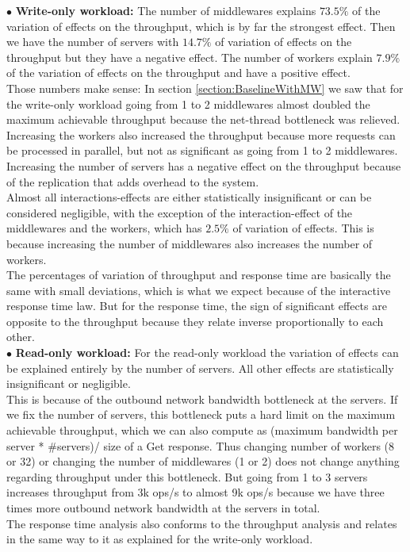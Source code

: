 $\bullet$ \textbf{Write-only workload:} The number of middlewares explains $73.5\%$ of the variation of effects on the throughput, which is by far the strongest effect. Then we have the number of servers with $14.7\%$ of variation of effects on the throughput but they have a negative effect. The number of workers explain $7.9\%$ of the variation of effects on the throughput and have a positive effect. \\
Those numbers make sense: In section \ref{section:BaselineWithMW} we saw that for the write-only workload going from 1 to 2 middlewares almost doubled the maximum achievable throughput because the net-thread bottleneck was relieved. Increasing the workers also increased the throughput because more requests can be processed in parallel, but not as significant as going from 1 to 2 middlewares. Increasing the number of servers has a negative effect on the throughput because of the replication that adds overhead to the system. \\
Almost all interactions-effects are either statistically insignificant or can be considered negligible, with the exception of the interaction-effect of the middlewares and the workers, which has $2.5\%$ of variation of effects. This is because increasing the number of middlewares also increases the number of workers. \\
The percentages of variation of throughput and response time are basically the same with small deviations, which is what we expect because of the interactive response time law. But for the response time, the sign of significant effects are opposite to the throughput because they relate inverse proportionally to each other. \\

$\bullet$ \textbf{Read-only workload:} For the read-only workload the variation of effects can be explained entirely by the number of servers. All other effects are statistically insignificant or negligible. \\
This is because of the outbound network bandwidth bottleneck at the servers. If we fix the number of servers, this bottleneck puts a hard limit on the maximum achievable throughput, which we can also compute as  (maximum bandwidth per server * \#servers)/ size of a Get response. Thus changing number of workers (8 or 32) or changing the number of middlewares (1 or 2) does not change anything regarding throughput under this bottleneck. But going from 1 to 3 servers increases throughput from 3k ops/s to almost 9k ops/s because we have three times more outbound network bandwidth at the servers in total. \\
The response time analysis also conforms to the throughput analysis and relates in the same way to it as explained for the write-only workload. 


